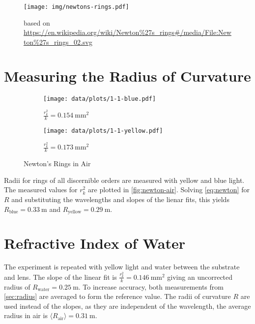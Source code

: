 \begin{figure}[tbp]
	\centering
	\texttt{[image: img/newtons-rings.pdf]}
	\caption{Newton's Rings}
	\label{fig:newton}
	\caption*{based on \url{https://en.wikipedia.org/wiki/Newton\%27s_rings\#/media/File:Newton\%27s_rings_02.svg}}
\end{figure}

\section{Measuring the Radius of Curvature}\label{sec:radius}

\begin{figure}[tbp]
	\centering
	\begin{subfigure}{.49\textwidth}
		\centering
		\texttt{[image: data/plots/1-1-blue.pdf]}
		\caption{Blue LED (\SI{465}{\nm})}
		\caption*{$\frac{r_k^2}{k} = \SI{0.154}{\mm\squared}$}
	\end{subfigure}
	\begin{subfigure}{.49\textwidth}
		\centering
		\texttt{[image: data/plots/1-1-yellow.pdf]}
		\caption{Yellow LED (\SI{590}{\nm})}
		\caption*{$\frac{r_k^2}{k} = \SI{0.173}{\mm\squared}$}
	\end{subfigure}
	\caption{Newton's Rings in Air}
	\label{fig:newton-air}
\end{figure}

Radii for rings of all discernible orders are measured with yellow and blue light.
The measured values for $r_k^2$ are plotted in \autoref{fig:newton-air}.
Solving \autoref{eq:newton} for $R$ and substituting the wavelengths and slopes of the lienar fits, this yields $R_\text{blue} = \SI{0.33}{\meter}$ and $R_\text{yellow} = \SI{0.29}{\meter}$.

\section{Refractive Index of Water}

The experiment is repeated with yellow light and water between the substrate and lens.
The slope of the linear fit is $\frac{r_k^2}{k} = \SI{0.146}{\mm\squared}$ giving an uncorrected radius of $R_\text{water} = \SI{0.25}{\meter}$.
To increase accuracy, both measurements from \autoref{sec:radius} are averaged to form the reference value.
The radii of curvature $R$ are used instead of the slopes, as they are independent of the wavelength, the average radius in air is $\langle R_\text{air} \rangle = \SI{0.31}{\meter}$.

